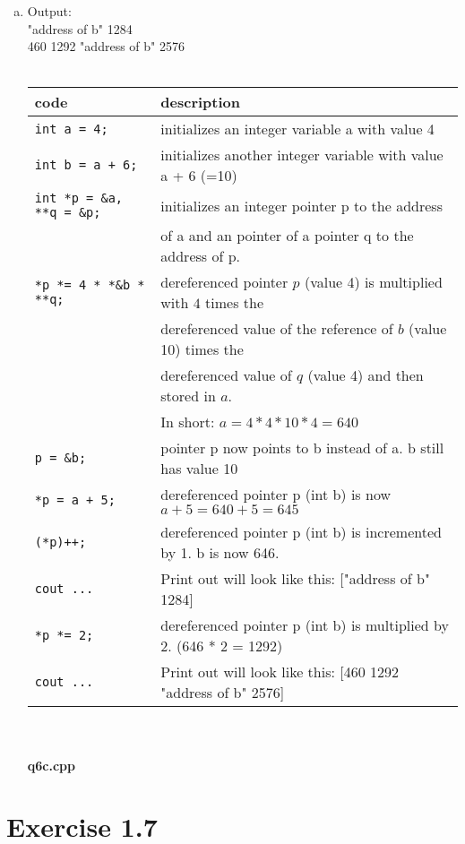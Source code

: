 \documentclass{article} %
\newcommand{\homeworkNumber}{1} %
\begin{document}
\begin{enumerate}[(a)]
\item Output:\\"address of b" 1284\\460 1292 "address of b" 2576\\\\
\begin{tabular}{l | l}\\
code & description\\
\hline
\verb|int a = 4;| & initializes an integer variable a with value 4\\
\verb|int b = a + 6;| & initializes another integer variable with value a + 6 (=10)\\
\verb|int *p = &a, **q = &p;| & initializes an integer pointer p to the address\\ & of a and an pointer of a pointer q to the address of p.\\
\verb|*p *= 4 * *&b * **q;| & dereferenced pointer $p$ (value 4) is multiplied with $4$ times the\\ & dereferenced value of the reference of $b$ (value 10) times the \\ & dereferenced value of $q$ (value 4) and then stored in $a$. \\ &
In short: $a = 4 * 4 * 10 * 4 = 640$ \\
\verb|p = &b;| & pointer p now points to b instead of a. b still has value 10\\
\verb|*p = a + 5;| & dereferenced pointer p (int b) is now $a + 5 = 640 + 5 = 645$\\
\verb|(*p)++;| & dereferenced pointer p (int b) is incremented by 1. b is now 646.\\
\verb|cout ...| & Print out will look like this: ["address of b" 1284]\\
\verb|*p *= 2;| & dereferenced pointer p (int b) is multiplied by 2. (646 * 2 = 1292)\\
\verb|cout ...| & Print out will look like this: [460 1292 "address of b" 2576]\\
\end{tabular}\\\\
\textbf{q6c.cpp}
\lstset{language=C++}


\clearpage

\end{enumerate}
\section*{Exercise \homeworkNumber.7}
\end{document}
